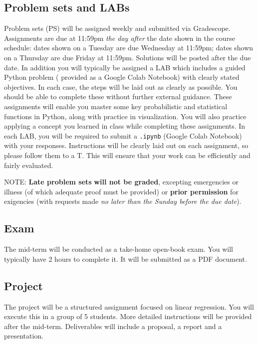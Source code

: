 \documentclass[11pt,twoside]{article}
\numberwithin{equation}{section}
\newcommand{\?}{\stackrel{?}{=}}
\newcommand{\rd}{\color{red}}
\begin{document}
\subsection{Problem sets and LABs}
Problem sets (PS) will be assigned weekly and submitted via Gradescope. Assignments are due at 11:59pm \textit{the day after} the date shown in the course schedule: dates shown on a Tuesday are due Wednesday at 11:59pm; dates shown on a Thursday are due Friday at 11:59pm.
Solutions will be posted after the due date.
In addition you will typically be assigned a LAB which includes a guided Python problem (
   provided as a Google Colab Notebook) with clearly stated objectives.  
In each case, the steps will be laid out as clearly as possible.  You should
be able to complete these without further external guidance.  
These assignments will enable you master some key probabilistic and statistical functions in Python, along with practice in visualization. 
You will also practice applying a concept you learned in class while completing these assignments.
In each LAB, you will be required to submit a %
\texttt{.ipynb} (Google Colab Notebook) with your responses.
Instructions will be clearly laid out on each assignment, so please follow them to a T.  This will ensure that your work
can be efficiently and fairly evaluated.

NOTE: {\rd \bf Late problem sets} \textbf{will not be graded}, excepting emergencies or illness (of which adequate proof must be provided) or {\bf  prior permission} for exigencies (with requests made 
{\it no later than the Sunday before the due date}). 


\subsection{Exam}
The mid-term will be conducted as a  take-home open-book exam. You will typically have 2 hours to complete it.
It will be submitted as a PDF document.

\subsection{Project}
The project will be a structured assignment focused on linear regression. 
You will execute this in a group of 5 students.
More detailed instructions will be provided after the mid-term.
Deliverables will include a proposal, a report and a presentation.
\end{document}
